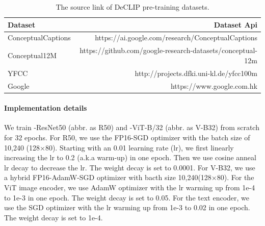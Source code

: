 \begin{table}[h]
\caption{\label{tab:pretrain datasets api}The source link of DeCLIP pre-training datasets.}
\label{sample-table}
\begin{center}
\begin{small}
\begin{sc}
\begin{tabular}{lr}
   \toprule  
   \textbf{Dataset}      &\textbf{Dataset Api} \\
   \midrule   
   ConceptualCaptions         &https://ai.google.com/research/ConceptualCaptions      \\
   Conceptual12M              &https://github.com/google-research-datasets/conceptual-12m \\
   YFCC                        &http://projects.dfki.uni-kl.de/yfcc100m      \\
   Google                      &https://www.google.com.hk \\ 
   \bottomrule
   
\end{tabular}
\end{sc}
\end{small}
\end{center}
\end{table}

\paragraph{Implementation details} We train \workname-ResNet50 (abbr. as R50) and \workname-ViT-B/32 (abbr. as V-B32) from scratch for 32 epochs.
For R50, we use the FP16-SGD optimizer with the batch size of 10,240 (128$\times$80). Starting with an 0.01 learning rate (lr), we first linearly increasing the lr to 0.2 (a.k.a warm-up) in one epoch. Then we use cosine anneal lr decay to decrease the lr. The weight decay is set to 0.0001.
For V-B32, we use a hybrid FP16-AdamW-SGD optimizer with bacth size 10,240(128$\times$80). For the ViT image encoder, we use AdamW optimizer with the lr warming up from 1e-4 to 1e-3 in one epoch. The weight decay is set to 0.05. For the text encoder, we use the SGD optimizer with the lr warming up from 1e-3 to 0.02 in one epoch. The weight decay is set to 1e-4.



